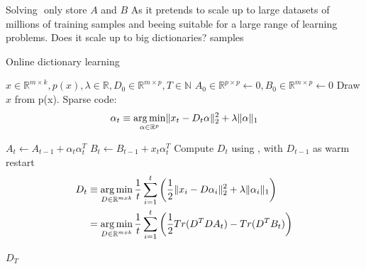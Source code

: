 Solving $ $ 
only store $A$ and $B$ 
As it pretends to scale up to large datasets of millions of training samples
and beeing suitable for a large range of learning problems.
Does it scale up to big dictionaries?
samples\cite{Mairal2010}
\begin{algorithm}[H]
\caption[\trainDL]{Online dictionary learning\cite{Mairal2010}}
\label{alg:trainDL}
\begin{algorithmic}[1]
\REQUIRE $x \in \mathbb{R}^{m \times k},  p \left( x \right), \lambda \in \mathbb{R}, D_0 \in \mathbb{R}^{m \times p}, T \in \mathbb{N}$
\STATE $A_0 \in \mathbb{R}^{p \times p} \gets  0, B_0 \in \mathbb{R}^{m \times p}\gets 0$
\STATE Draw $x$ from p(x).
\STATE Sparse code:
\begin{align*} 
\alpha_t \equiv \operatorname*{arg\,min}_{\alpha\in\mathbb{R}^{p}}  \lVert x_t - D_t\alpha \rVert^{2}_{2}  +  \lambda \lVert \alpha \rVert_{1}
\end{align*}

\STATE $A_t \gets A_{t-1} + \alpha_t\alpha_t^T$\label{alg:Aupdate}
\STATE $B_t \gets B_{t-1} + x_t\alpha_t^T$\label{alg:Bupdate}
\STATE Compute $D_t$ using , with $D_{t-1}$ as warm restart 
\begin{equation}
\begin{split}
D_t  & \equiv \operatorname*{arg\,min}_{D \in \mathbb{R}^{m x k}}  \frac{1}{t} \sum_{i=1}^t
\left( \frac{1}{2} \lVert x_i - D\alpha_i \rVert^{2}_{2}  +  \lambda \lVert
\alpha_i \rVert_{1} \right) \\
& = \operatorname*{arg\,min}_{D \in \mathbb{R}^{m x k}}  \frac{1}{t} \sum_{i=1}^t
\left( \frac{1}{2} Tr(D^TDA_t) - Tr(D^TB_t)\right) \label{eq:update}
\end{split}
\end{equation}
 
\ENDFOR
\RETURN $D_T$
\end{algorithmic}
\end{algorithm}


